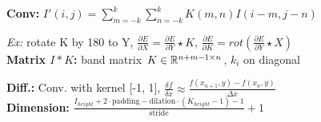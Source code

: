 \textbf{Conv:} $I'(i,j) = \sum_{m = -k}^k \sum_{n= -k}^k K(m,n) I(i-m, j-n)$\\

\textit{Ex:} rotate K by 180 to Y, $\frac{\partial E}{\partial X} = \frac{\partial E}{\partial Y} \star K$, $\frac{\partial E}{\partial K} = rot(\frac{\partial E}{\partial Y} \star X)$ \\

\textbf{Matrix $I * K$:} band matrix $K \in \mathbb{R}^{n+m-1 \times n}$, $k_i$ on diagonal\\

\textbf{Diff.:} Conv. with kernel [-1, 1], $\frac{\delta f}{\delta x} \approx \frac{f(x_{n+1}, y) - f(x_n, y)}{\Delta x}$\\


\textbf{Dimension:} $\frac{I_{height} + 2 \cdot \text{padding} - \text{dilation} \cdot (K_{height} - 1) - 1}{\text{stride}} + 1$\\

